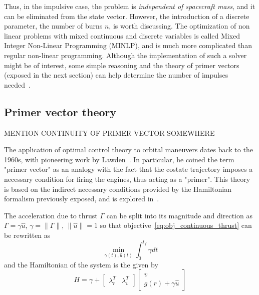 Thus, in the impulsive case, the problem is \textit{independent of spacecraft mass}, and it can be eliminated from the state vector. However, the introduction of a discrete parameter, the number of burns \(n\), is worth discussing. The optimization of non linear problems with mixed continuous and discrete variables is called Mixed Integer Non-Linear Programming (MINLP), and is much more complicated than regular non-linear programming. Although the implementation of such a solver might be of interest, some simple reasoning and the theory of primer vectors (exposed in the next section) can help determine the number of impulses needed~\cite{interactive_primer_vector}.

\subsection{Primer vector theory}

MENTION CONTINUITY OF PRIMER VECTOR SOMEWHERE

The application of optimal control theory to orbital maneuvers dates back to the 1960s, with pioneering work by Lawden~\cite{Conway_2010}. In particular, he coined the term "primer vector"  as an analogy with the fact that the costate trajectory imposes a necessary condition for firing the engines, thus acting as a "primer". This theory is based on the indirect necessary conditions provided by the Hamiltonian formalism previously exposed, and is explored in~\cite{Conway_2010}.

The acceleration due to thrust \(\Gamma \) can be split into its magnitude and direction as \(\Gamma = \gamma \hat u\), \(\gamma = \lVert \Gamma \rVert\), \(\lVert \hat u \rVert = 1\) so that objective~\eqref{eq:obj_continuous_thrust} can be rewritten as
\begin{equation}
    \min_{\gamma(t), \hat u(t)} \int_0^{t_f} \gamma dt
\end{equation}
and the Hamiltonian of the system is the given by
\begin{equation}
    H = \gamma + \begin{bmatrix}
        \lambda_r^T & \lambda_v^T
    \end{bmatrix} \begin{bmatrix}
        v \\ g(r) + \gamma \hat u
    \end{bmatrix}
\end{equation}

